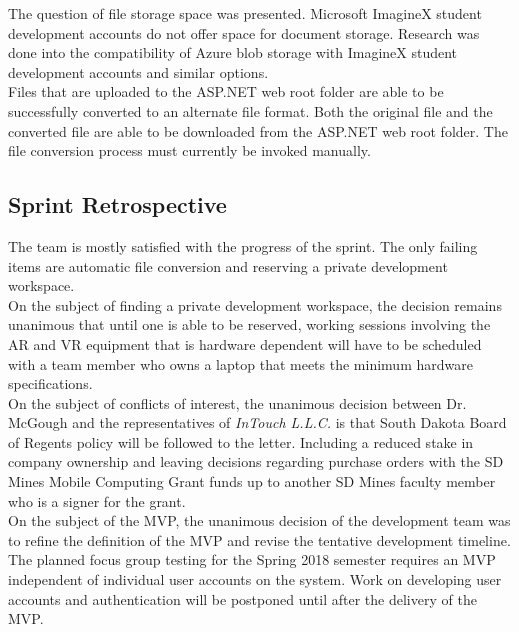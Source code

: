         The question of file storage space was presented.  Microsoft ImagineX student development accounts do not
        offer space for document storage.  Research was done into the compatibility of Azure blob storage with 
        ImagineX student development accounts and similar options.\\
        
        Files that are uploaded to the ASP.NET web root folder are able to be successfully converted to an alternate
        file format.  Both the original file and the converted file are able to be downloaded from the ASP.NET web root
        folder.  The file conversion process must currently be invoked manually.\\

    \subsection{Sprint Retrospective}
    \label{sec:Sprint3_retrospective}
        \hspace{7mm}
        The team is mostly satisfied with the progress of the sprint.  The only failing items are automatic file
        conversion and reserving a private development workspace.\\

        On the subject of finding a private development workspace, the decision remains unanimous that until one 
        is able to be reserved, working sessions involving the AR and VR equipment that is hardware dependent 
        will have to be scheduled with a team member who owns a laptop that meets the minimum hardware
        specifications.\\

        On the subject of conflicts of interest, the unanimous decision between Dr. McGough and the representatives
        of \textit{InTouch L.L.C.} is that South Dakota Board of Regents policy will be followed to the letter.
        Including a reduced stake in company ownership and leaving decisions regarding purchase orders with the SD 
        Mines Mobile Computing Grant funds up to another SD Mines faculty member who is a signer for the grant.\\
        
        On the subject of the MVP, the unanimous decision of the development team was to refine the definition of
        the MVP and revise the tentative development timeline.  The planned focus group testing for the Spring 2018
        semester requires an MVP independent of individual user accounts on the system.  Work on developing user
        accounts and authentication will be postponed until after the delivery of the MVP.\\

